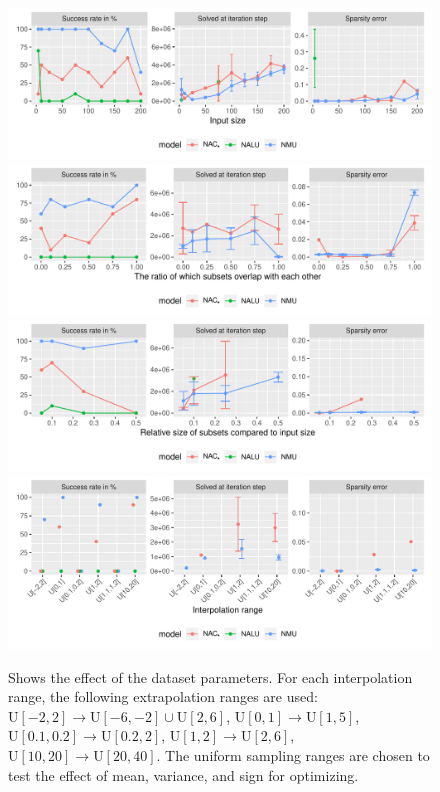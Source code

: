 \begin{figure}[h]
\centering
\includegraphics[width=\linewidth,trim={0 1.3cm 0 0},clip]{results/simple_function_static_input_size.pdf}
\includegraphics[width=\linewidth,trim={0 1.3cm 0 0.809cm},clip]{results/simple_function_static_overlap.pdf}
\includegraphics[width=\linewidth,trim={0 1.3cm 0 0.809cm},clip]{results/simple_function_static_subset.pdf}
\includegraphics[width=\linewidth,trim={0 0 0 0.809cm},clip]{results/simple_function_static_range.pdf}
\caption{Shows the effect of the dataset parameters. For each interpolation range, the following extrapolation ranges are used: ${\mathrm{U}[-2,2] \rightarrow \mathrm{U}[-6,-2] \cup \mathrm{U}[2,6]}$, ${\mathrm{U}[0,1] \rightarrow \mathrm{U}[1,5]}$, ${\mathrm{U}[0.1,0.2] \rightarrow \mathrm{U}[0.2,2]}$, ${\mathrm{U}[1,2] \rightarrow \mathrm{U}[2,6]}$, ${\mathrm{U}[10, 20] \rightarrow \mathrm{U}[20, 40]}$. The uniform sampling ranges are chosen to test the effect of mean, variance, and sign for optimizing.}
\label{fig:simple-function-static-boundary}
\end{figure}

